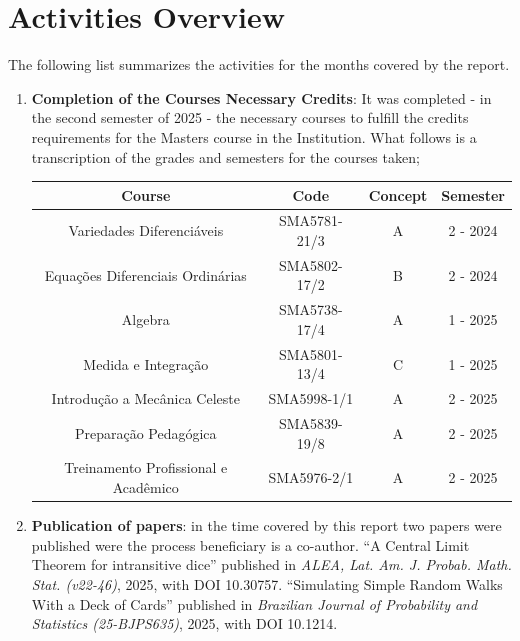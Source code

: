 \documentclass[12pt]{report}
\begin{document}
\sectionfont{\scshape}



\section{Activities Overview}
\label{section:atividadesdesenvolvidas}

The following list summarizes the activities for the months covered by the report.

\begin{enumerate}
	\item \textbf{Completion of the Courses Necessary Credits}: It was completed  - in the second semester of 2025 - the necessary courses to fulfill the credits requirements for the Masters course in the Institution. What follows is a transcription of the grades and semesters for the courses taken;
	
	\begin{center}
		\begin{tabular}{|c|c|c|c|}
			\hline
			\textbf{Course} & \textbf{Code} & \textbf{Concept} & \textbf{Semester} \\
			\hline
			Variedades Diferenciáveis & SMA5781-21/3 & A & 2 - 2024 \\
			\hline
			Equações Diferenciais Ordinárias & SMA5802-17/2 & B & 2 - 2024 \\
			\hline
			Algebra& SMA5738-17/4 & A & 1 - 2025 \\
			\hline
			Medida e Integração & SMA5801-13/4 & C & 1 - 2025 \\
			\hline
			Introdução a Mecânica Celeste& SMA5998-1/1 & A & 2 - 2025 \\
			\hline
			Preparação Pedagógica& SMA5839-19/8 & A & 2 - 2025 \\
			\hline
			Treinamento Profissional e Acadêmico & SMA5976-2/1 & A & 2 - 2025 \\
			\hline
		\end{tabular}
	\end{center}
	
	\item \textbf{Publication of papers}: in the time covered by this report two papers were published were the process beneficiary is a co-author.	\enquote{A Central Limit Theorem for intransitive dice} published in \textit{ALEA, Lat. Am. J. Probab. Math. Stat. (v22-46)}, 2025, with DOI 10.30757. 	\enquote{Simulating Simple Random Walks With a Deck of Cards} published in \textit{Brazilian Journal of Probability and Statistics (25-BJPS635)}, 2025, with DOI 10.1214.
	

\end{enumerate}
\end{document}
